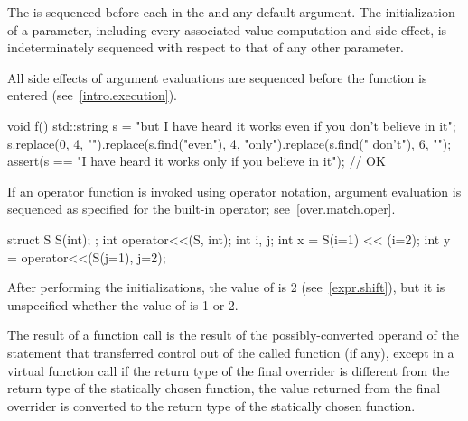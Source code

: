 \pnum
{}%
%
%
The  is sequenced before
each  in the 
and any default argument.
The initialization of a parameter,
including every associated value computation and side effect,
is indeterminately sequenced with respect to that of any other parameter.
\begin{note}
All side effects of
argument evaluations are sequenced before the function is
entered (see~\ref{intro.execution}).
\end{note}
\begin{example}
\begin{codeblock}
void f() {
  std::string s = "but I have heard it works even if you don't believe in it";
  s.replace(0, 4, "").replace(s.find("even"), 4, "only").replace(s.find(" don't"), 6, "");
  assert(s == "I have heard it works only if you believe in it");       // OK
}
\end{codeblock}
\end{example}
\begin{note}
If an operator function is invoked
using operator notation,
argument evaluation is sequenced
as specified for the built-in operator;
see~\ref{over.match.oper}.
\end{note}
\begin{example}
\begin{codeblock}
struct S {
  S(int);
};
int operator<<(S, int);
int i, j;
int x = S(i=1) << (i=2);
int y = operator<<(S(j=1), j=2);
\end{codeblock}
After performing the initializations,
the value of  is 2 (see~\ref{expr.shift}),
but it is unspecified whether the value of  is 1 or 2.
\end{example}

\pnum
The result of a function call is the result of the possibly-converted operand
of the  statement
that transferred control out of the called function (if any),
except in a virtual function call if the return type of the
final overrider is different from the return type of the statically
chosen function, the value returned from the final overrider is
converted to the return type of the statically chosen function.

